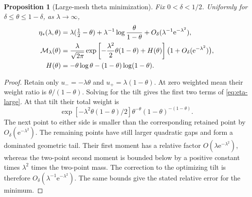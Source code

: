 \documentclass[11pt,a4paper]{article}
\numberwithin{equation}{section}
\newtheorem{proposition}[theorem]{Proposition}
\theoremstyle{definition}\newtheorem{definition}[theorem]{Definition}
\theoremstyle{remark}\newtheorem{remark}[theorem]{Remark}
\newcommand{\e}{\mathrm e}
\newcommand{\calM}{\mathcal M}
\begin{document}
\begin{proposition}[Large-mesh theta minimization]
\label{prop:largetheta}
Fix $0<\delta<1/2$. Uniformly for $\delta\le\theta\le1-\delta$, as
$\lambda\to\infty$,
\begin{align}
 \eta_*(\lambda,\theta)
 &=\lambda(\tfrac12-\theta)
   +\lambda^{-1}\log\frac{\theta}{1-\theta}
   +O_\delta(\lambda^{-1}\e^{-\lambda^2}),\label{eq:eta-large}\\
 \calM_\lambda(\theta)
 &=\frac\lambda{\sqrt{2\pi}}
    \exp\left[-\frac{\lambda^2}{2}\theta(1-\theta)
                    +H(\theta)\right]
      \bigl(1+O_\delta(\e^{-\lambda^2})\bigr),\label{eq:M-large}\\
 H(\theta)&=-\theta\log\theta-(1-\theta)\log(1-\theta).
 \notag
\end{align}
\end{proposition}
\begin{proof}
Retain only $u_-=-\lambda\theta$ and $u_+=\lambda(1-\theta)$.
At zero weighted mean their weight ratio is $\theta/(1-\theta)$.
Solving for the tilt gives the first two terms of \eqref{eq:eta-large}.
At that tilt their total weight is
\[
 \exp[-\lambda^2\theta(1-\theta)/2]
 \theta^{-\theta}(1-\theta)^{-(1-\theta)}.
\]
The next point to either side is smaller than the corresponding retained
point by $O_\delta(\e^{-\lambda^2})$. The remaining points have still
larger quadratic gaps and form a dominated geometric tail. Their first
moment has a relative factor $O(\lambda\e^{-\lambda^2})$, whereas the
two-point second moment is bounded below by a positive constant times
$\lambda^2$ times the two-point mass. The correction to the optimizing
tilt is therefore $O_\delta(\lambda^{-1}\e^{-\lambda^2})$. The same
bounds give the stated relative error for the minimum.
\end{proof}
\end{document}
